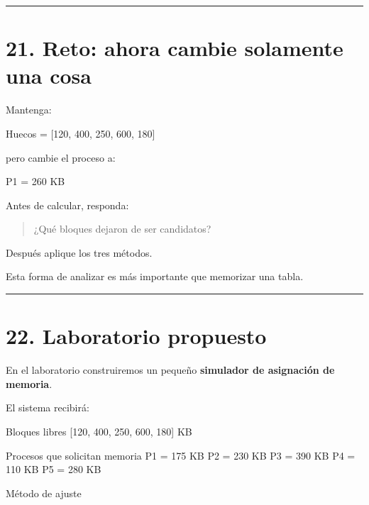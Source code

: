 \documentclass[
  spanish,
  letterpaper,
]{scrbook}
\newenvironment{Shaded}{\begin{snugshade}}{\end{snugshade}}
\newcommand{\NormalTok}[1]{\textcolor[rgb]{0.00,0.23,0.31}{#1}}
\begin{document}
\begin{center}\rule{0.5\linewidth}{0.5pt}\end{center}


\chapter{21. Reto: ahora cambie solamente una
cosa}\label{reto-ahora-cambie-solamente-una-cosa}

Mantenga:

\begin{Shaded}
\begin{Highlighting}[]
\NormalTok{Huecos = [120, 400, 250, 600, 180]}
\end{Highlighting}
\end{Shaded}

pero cambie el proceso a:

\begin{Shaded}
\begin{Highlighting}[]
\NormalTok{P1 = 260 KB}
\end{Highlighting}
\end{Shaded}

Antes de calcular, responda:

\begin{quote}
¿Qué bloques dejaron de ser candidatos?
\end{quote}

Después aplique los tres métodos.

Esta forma de analizar es más importante que memorizar una tabla.

\begin{center}\rule{0.5\linewidth}{0.5pt}\end{center}


\chapter{22. Laboratorio propuesto}\label{laboratorio-propuesto}

En el laboratorio construiremos un pequeño \textbf{simulador de
asignación de memoria}.

El sistema recibirá:

\begin{Shaded}
\begin{Highlighting}[]
\NormalTok{Bloques libres}
\NormalTok{[120, 400, 250, 600, 180] KB}

\NormalTok{Procesos que solicitan memoria}
\NormalTok{P1 = 175 KB}
\NormalTok{P2 = 230 KB}
\NormalTok{P3 = 390 KB}
\NormalTok{P4 = 110 KB}
\NormalTok{P5 = 280 KB}

\NormalTok{Método de ajuste}
\end{Highlighting}
\end{Shaded}
\end{document}
